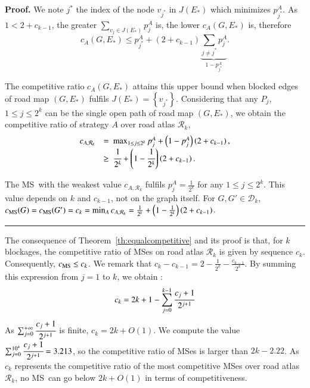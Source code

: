 \documentclass[preprint]{elsarticle}
\newenvironment{proof}[1][Proof]{\textbf{#1.} }{\ \rule{0.5em}{0.5em}}
\newcommand{\set}[1]{\left\{ #1 \right\}}
\newcommand{\mcalr}{\mathcal{R}}
\newcommand{\mcald}{\mathcal{D}}
\newcommand{\mts}{MS}
\newcommand{\cms}{c_{\mbox{\scriptsize{MS}}}}
\begin{document}
\begin{proof}
We note $j^*$ the index of the node $v_{j^*}$ in $J\left(E_*\right)$ which minimizes $p_{j^*}^A$. As $1 < 2 + c_{k-1}$, the greater $\sum_{v_j\in J(E_*)} p_j^A$ is, the lower $c_A(G, E_*)$ is, therefore
\[
c_A(G, E_*) \le p_{j^*}^A + (2+c_{k-1})\underbrace{\sum_{j\neq j^*}p_j^A }_{1-p_{j^*}^A}.
\] 

The competitive ratio $c_A(G, E_*)$ attains this upper bound when blocked edges of road map $\left(G,E_*\right)$ fulfils $J\left(E_*\right) = \set{v_{j^*}}$. Considering that any $P_j$, $1 \le j \le 2^k$ can be the single open path of road map $\left(G,E_*\right)$, we obtain the competitive ratio of strategy $A$ over road atlas $\mcalr_k$,
\[
\begin{array}{rl}
c_{A,\mcalr_k} & =  ~\max_{1 \le j \le 2^k} p_j^{A} + \left(1-p_j^{A}\right)\left(2+c_{k-1}\right),\\
& \geq ~\cfrac{1}{2^k} + \left(1-\cfrac{1}{2^k}\right)\left(2+c_{k-1}\right).
\end{array}
\]

The \mts ~with the weakest value $c_{A,\mcalr_k}$ fulfils $p_j^A = \frac{1}{2^k}$ for any $1 \le j \le 2^k$. This value depends on $k$ and $c_{k-1}$, not on the graph itself. For $G,G' \in \mcald_k$, $\cms(G) = \cms(G') = c_k = \min_{A} c_{A,\mcalr_k} = \frac{1}{2^k} + \left(1-\frac{1}{2^k}\right)\left(2+c_{k-1}\right)$.
\end{proof}

The consequence of Theorem~\ref{th:equalcompetitive} and its proof is that, for $k$ blockages, the competitive ratio of \mts es on road atlas $\mcalr_k$ is given by sequence $c_k$. Consequently, $\cms \le c_k$.
We remark that $c_k - c_{k-1} = 2 - \frac{1}{2^{k}} - \frac{c_{k-1}}{2^{k}}$.
By summing this expression from $j = 1$ to $k$, we obtain :
\[
c_k = 2k+1-\sum_{j=0}^{k-1}\cfrac{c_j+1}{2^{j+1}}
\]
As $\sum_{j=0}^{+\infty}\cfrac{c_j+1}{2^{j+1}}$ is finite, $c_k = 2k + O(1)$. We compute the value $\sum_{j=0}^{10^4}\cfrac{c_j+1}{2^{j+1}} = 3.213$, so the competitive ratio of \mts es is larger than $2k-2.22$. As $c_k$ represents the competitive ratio of the most competitive \mts es over road atlas $\mcalr_k$, no \mts ~can go below $2k+O\left(1\right)$ in terms of competitiveness.
\end{document}
